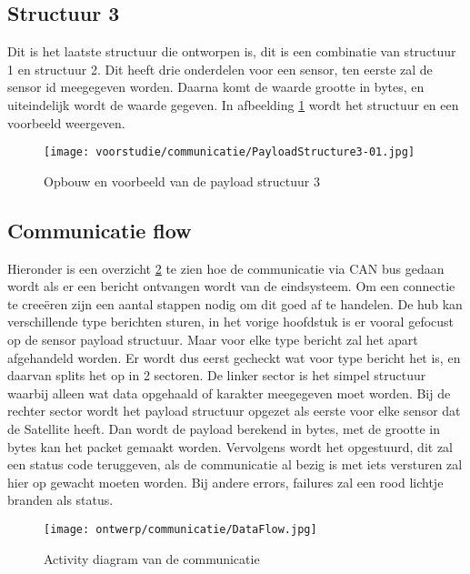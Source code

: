 \subsection{Structuur 3}
Dit is het laatste structuur die ontworpen is, dit is een combinatie van structuur 1 en structuur 2. Dit heeft drie onderdelen voor een sensor, ten eerste zal de sensor id meegegeven worden. Daarna komt de waarde grootte in bytes, en uiteindelijk wordt de waarde gegeven. In afbeelding \ref{fig:Structure3} wordt het structuur en een voorbeeld weergeven.
\begin{figure}[h!]
	\label{fig:Structure3}
	\caption{Opbouw en voorbeeld van de payload structuur 3}
	\texttt{[image: voorstudie/communicatie/PayloadStructure3-01.jpg]}
\end{figure}

\newpage
\subsection{Communicatie flow}
Hieronder is een overzicht \ref{fig:comflow} te zien hoe de communicatie via CAN bus gedaan wordt als er een bericht ontvangen wordt van de eindsysteem. Om een connectie te creeëren zijn een aantal stappen nodig om dit goed af te handelen. De hub kan verschillende type berichten sturen, in het vorige hoofdstuk is er vooral gefocust op de sensor payload structuur. Maar voor elke type bericht zal het apart afgehandeld worden. Er wordt dus eerst gecheckt wat voor type bericht het is, en daarvan splits het op in 2 sectoren. De linker sector is het simpel structuur waarbij alleen wat data opgehaald of karakter meegegeven moet worden. Bij de rechter sector wordt het payload structuur opgezet als eerste voor elke sensor dat de Satellite heeft. Dan wordt de payload berekend in bytes, met de grootte in bytes kan het packet gemaakt worden. Vervolgens wordt het opgestuurd, dit zal een status code teruggeven, als de communicatie al bezig is met iets versturen zal hier op gewacht moeten worden. Bij andere errors, failures zal een rood lichtje branden als status.
\begin{figure}[h!]
	\centering
	\label{fig:comflow}
	\caption{Activity diagram van de communicatie}
	\texttt{[image: ontwerp/communicatie/DataFlow.jpg]}
\end{figure}

\newpage
